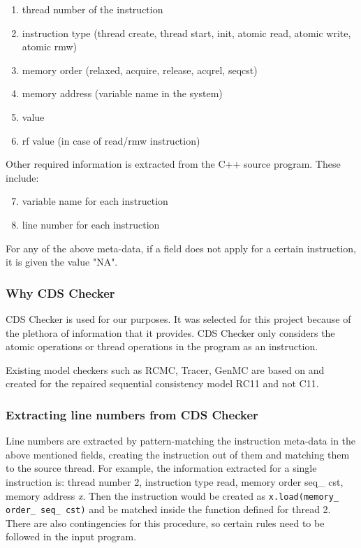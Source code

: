 \begin{enumerate}
	\item thread number of the instruction
	\item instruction type (thread create, thread start, init, atomic read, atomic write, atomic rmw)
	\item memory order (relaxed, acquire, release, acq\textunderscore rel, seq\textunderscore cst)
	\item memory address (variable name in the system)
	\item value
	\item rf value (in case of read/rmw instruction)
\end{enumerate}

\par 
Other required information is extracted from the C++ source program. These include:
\begin{enumerate}
	\setcounter{enumi}{6}
	\item variable name for each instruction
	\item line number for each instruction
\end{enumerate}

\par
For any of the above meta-data, if a field does not apply for a certain instruction, it is given the value "NA".

\subsubsection{Why CDS Checker}
CDS Checker is used for our purposes. It was selected for this project because of the plethora of information that it provides. CDS Checker only considers the atomic operations or thread operations in the program as an instruction.

Existing model checkers such as RCMC, Tracer, GenMC are based on and created for the repaired sequential consistency model RC11 and not C11. 

\subsubsection{Extracting line numbers from CDS Checker}
Line numbers are extracted by pattern-matching the instruction meta-data in the above mentioned fields, creating the instruction out of them and matching them to the source thread. For example, the information extracted for a single instruction is: thread number 2, instruction type read, memory order seq\_ cst, memory address \textit{x}. Then the instruction would be created as \texttt{x.load(memory\_ order\_ seq\_ cst)} and be matched inside the function defined for thread 2. There are also contingencies for this procedure, so certain rules need to be followed in the input program.

